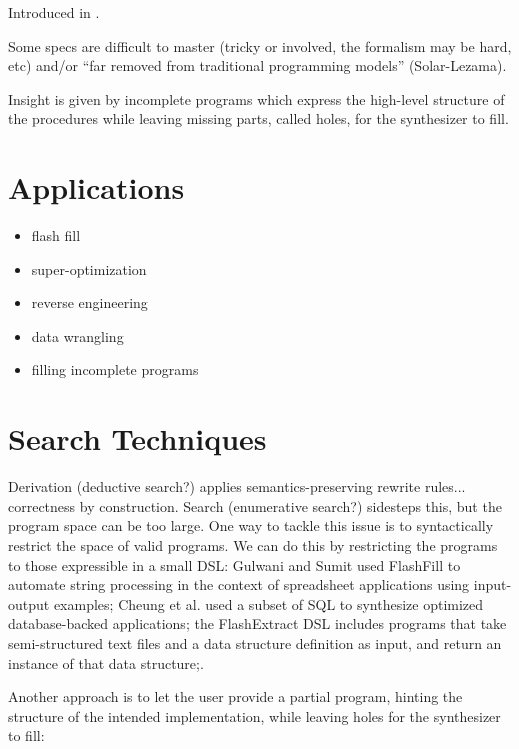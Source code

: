 Introduced in \cite{Solar-Lezama:2008}.

Some specs are difficult to master (tricky or involved, the formalism may be
hard, etc) and/or ``far removed from traditional programming models'' (Solar-Lezama).

Insight is given by incomplete programs which express the high-level structure
of the procedures while leaving missing parts, called holes, for the synthesizer
to fill.

\section{Applications}
\label{sec:applications}

\begin{itemize}
\item flash fill
\item super-optimization
\item reverse engineering
\item data wrangling
\item filling incomplete programs
\end{itemize}

\section{Search Techniques}
\label{sec:search-techniques}

 Derivation (deductive search?)
applies semantics-preserving rewrite rules... correctness by construction.
Search (enumerative search?) sidesteps this, but the program space can be too
large. One way to tackle this issue is to syntactically restrict the space of
valid programs. We can do this by restricting the programs to those expressible
in a small DSL:  Gulwani and
Sumit \cite{Gulwani:2011} used FlashFill to automate string processing in the
context of spreadsheet applications using input-output examples; Cheung et al.
\cite{Cheung:2013} used a subset of SQL to synthesize optimized database-backed
applications; the FlashExtract DSL \cite{Le:2014} includes programs that take
semi-structured text files and a data structure definition as input, and return
an instance of that data structure;.

Another approach is to let the user provide a partial program, hinting the
structure of the intended implementation, while leaving holes for the
synthesizer to fill:

